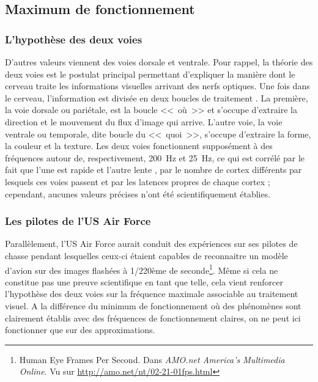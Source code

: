 	\subsection{Maximum de fonctionnement}	
	\subsubsection{L'hypothèse des deux voies}
	\par D'autres valeurs viennent des voies dorsale et ventrale. Pour rappel, la théorie des deux voies est le postulat principal permettant d'expliquer la manière dont le cerveau traite les informations visuelles arrivant des nerfs optiques. Une fois dans le cerveau, l'information est divisée en deux boucles de traitement \citep{ingle_two_1982,dhondt_emotion_2011}. La première, la voie dorsale ou pariétale, est la boucle <<~où~>> et s'occupe d'extraire la direction et le mouvement du flux d'image qui arrive. L'autre voie, la voie ventrale ou temporale, dite boucle du <<~quoi~>>, s'occupe d'extraire la forme, la couleur et la texture. Les deux voies fonctionnent supposément à des fréquences autour de, respectivement, 200~Hz et 25~Hz, ce qui est corrélé par le fait que l'une est rapide et l'autre lente \citep{dhondt_emotion_2011}, par le nombre de cortex différents par lesquels ces voies passent \citep{dhondt_emotion_2011} et par les latences propres de chaque cortex \citep{bullier_integrated_2001} ; cependant, aucunes valeurs précises n'ont été scientifiquement établies.
	
	\subsubsection{Les pilotes de l'US Air Force}	
	Parallèlement, l'US Air Force aurait conduit des expériences sur ses pilotes de chasse pendant lesquelles ceux-ci étaient capables de reconnaitre un modèle d'avion sur des images flashées à 1/220ème de seconde\footnote{Human Eye Frames Per Second. Dans \textit{AMO.net America's Multimedia Online}. Vu sur \url{http://amo.net/nt/02-21-01fps.html}}. Même si cela ne constitue pas une preuve scientifique en tant que telle, cela vient renforcer l'hypothèse des deux voies sur la fréquence maximale associable au traitement visuel. A la différence du minimum de fonctionnement où des phénomènes sont clairement établis avec des fréquences de fonctionnement claires, on ne peut ici fonctionner que sur des approximations.
		
